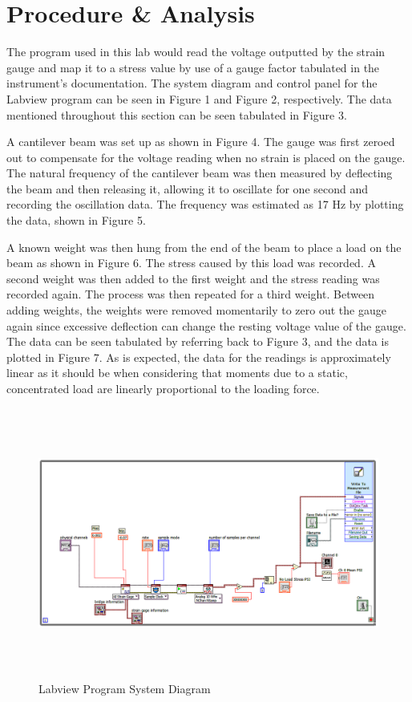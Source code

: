 \documentclass[12pt]{article}
\begin{document}
\section*{\fontsize{12}{12}\selectfont \large Procedure \& Analysis}

The program used in this lab would read the voltage outputted by the strain gauge and map it to a stress value by use of a gauge factor tabulated in the instrument's documentation. The system diagram and control panel for the Labview program can be seen in Figure 1 and Figure 2, respectively. The data mentioned throughout this section can be seen tabulated in Figure 3. 
\bigskip

A cantilever beam was set up as shown in Figure 4. The gauge was first zeroed out to compensate for the voltage reading when no strain is placed on the gauge. The natural frequency of the cantilever beam was then measured by deflecting the beam and then releasing it, allowing it to oscillate for one second and recording the oscillation data. The frequency was estimated as 17 Hz by plotting the data, shown in Figure 5.
\bigskip
 
A known weight was then hung from the end of the beam to place a load on the beam as shown in Figure 6. The stress caused by this load was recorded. A second weight was then added to the first weight and the stress reading was recorded again. The process was then repeated for a third weight. Between adding weights, the weights were removed momentarily to zero out the gauge again since excessive deflection can change the resting voltage value of the gauge. The data can be seen tabulated by referring back to Figure 3, and the data is plotted in Figure 7. As is expected, the data for the readings is approximately linear as it should be when considering that moments due to a static, concentrated load are linearly proportional to the loading force.
\bigskip

\newpage

\begin{figure}[h!] %
   \centering
   \includegraphics[width=5.5in, height=3.5in]{lab10vi.png} 
   \caption{Labview Program System Diagram}
   \label{fig:example}
\end{figure}
\end{document}
